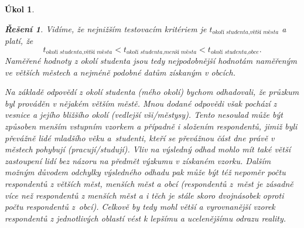 \documentclass[11pt, a4paper]{article}
\theoremstyle{result}
\newtheorem*{result}{Řešení}
\newtheorem{task}{Úkol}
\begin{document}
\begin{task}
\begin{enumerate}[a)]
\begin{result}
            Vidíme, že nejnižším testovacím kritériem je $t_{\textit{okolí studenta}, \textit{větší města}}$ a platí, že
            $$t_{\textit{okolí studenta}, \textit{větší města}} < t_{\textit{okolí studenta}, \textit{menší města}} < t_{\textit{okolí studenta}, \textit{obce}}.$$
            Naměřené hodnoty z \textit{okolí studenta} jsou tedy nejpodobnější hodnotám naměřeným ve \textit{větších městech} a nejméně podobné datům získaným v \textit{obcích}.
            
            Na základě odpovědí z \textit{okolí studenta} (mého okolí) bychom odhadovali, že průzkum byl prováděn v nějakém větším městě. Mnou dodané odpovědi však pochází z vesnice a jejího bližšího okolí (vedlejší vši/městysy). Tento nesoulad může být způsoben menším vstupním vzorkem a případně i složením respondentů, jimiž byli převážně lidé mladšího věku a~studenti, kteří se převážnou část dne právě v městech pohybují (pracují/studují). Vliv na výsledný odhad mohlo mít také větší zastoupení lidí bez názoru na předmět výzkumu v získaném vzorku. Dalším možným důvodem odchylky výsledného odhadu pak může být též nepoměr počtu respondentů z větších měst, menších měst a obcí (respondentů z~měst je zásadně více než respondentů z menších měst a i těch je stále skoro dvojnásobek oproti počtu respondentů z~obcí). Celkově by tedy mohl větší a vyrovnanější vzorek respondentů z jednotlivých oblastí vést k lepšímu a ucelenějšímu odrazu reality.
        \end{result}
    \end{enumerate}
\end{task}
\end{document}
